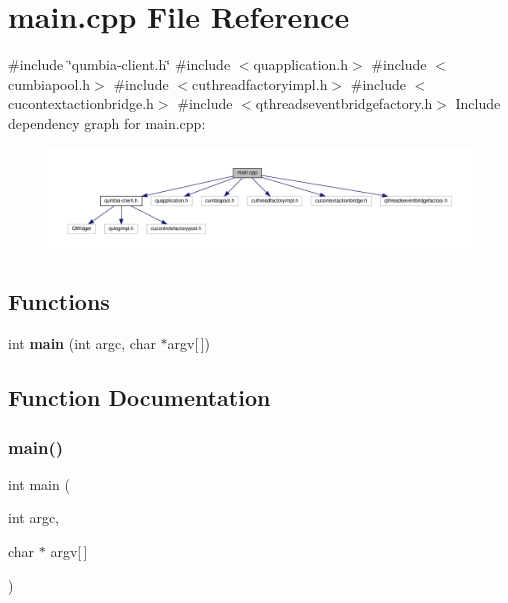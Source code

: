 \section{main.\+cpp File Reference}
\label{main_8cpp}
{\ttfamily \#include \char`\"{}qumbia-\/client.\+h\char`\"{}}\newline
{\ttfamily \#include $<$quapplication.\+h$>$}\newline
{\ttfamily \#include $<$cumbiapool.\+h$>$}\newline
{\ttfamily \#include $<$cuthreadfactoryimpl.\+h$>$}\newline
{\ttfamily \#include $<$cucontextactionbridge.\+h$>$}\newline
{\ttfamily \#include $<$qthreadseventbridgefactory.\+h$>$}\newline
Include dependency graph for main.\+cpp\+:\nopagebreak
\begin{figure}[H]
\begin{center}
\leavevmode
\includegraphics[width=350pt]{main_8cpp__incl}
\end{center}
\end{figure}
\subsection*{Functions}
\begin{DoxyCompactItemize}
\item 
int \textbf{ main} (int argc, char $\ast$argv[$\,$])
\end{DoxyCompactItemize}


\subsection{Function Documentation}
\mbox{\label{main_8cpp_a0ddf1224851353fc92bfbff6f499fa97}} 
\subsubsection{main()}
{\footnotesize\ttfamily int main (\begin{DoxyParamCaption}\item[{int}]{argc,  }\item[{char $\ast$}]{argv[$\,$] }\end{DoxyParamCaption})}

